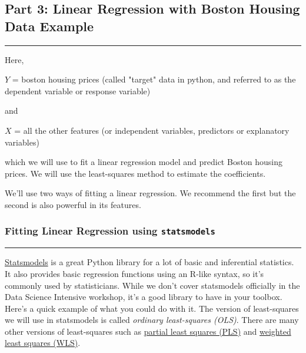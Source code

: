 \documentclass[11pt]{article}
\begin{document}
    \subsection{Part 3: Linear Regression with Boston Housing Data
Example}\label{part-3-linear-regression-with-boston-housing-data-example}

\begin{center}\rule{0.5\linewidth}{\linethickness}\end{center}

Here,

\(Y\) = boston housing prices (called "target" data in python, and
referred to as the dependent variable or response variable)

and

\(X\) = all the other features (or independent variables, predictors or
explanatory variables)

which we will use to fit a linear regression model and predict Boston
housing prices. We will use the least-squares method to estimate the
coefficients.

    We'll use two ways of fitting a linear regression. We recommend the
first but the second is also powerful in its features.

    \subsubsection{\texorpdfstring{Fitting Linear Regression using
\texttt{statsmodels}}{Fitting Linear Regression using statsmodels}}\label{fitting-linear-regression-using-statsmodels}

\begin{center}\rule{0.5\linewidth}{\linethickness}\end{center}

\href{http://statsmodels.sourceforge.net/}{Statsmodels} is a great
Python library for a lot of basic and inferential statistics. It also
provides basic regression functions using an R-like syntax, so it's
commonly used by statisticians. While we don't cover statsmodels
officially in the Data Science Intensive workshop, it's a good library
to have in your toolbox. Here's a quick example of what you could do
with it. The version of least-squares we will use in statsmodels is
called \emph{ordinary least-squares (OLS)}. There are many other
versions of least-squares such as
\href{https://en.wikipedia.org/wiki/Partial_least_squares_regression}{partial
least squares (PLS)} and
\href{https://en.wikipedia.org/wiki/Iteratively_reweighted_least_squares}{weighted
least squares (WLS)}.
\end{document}
